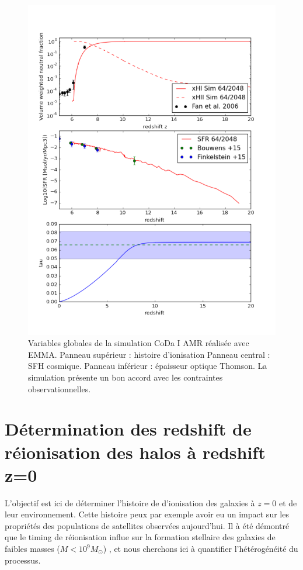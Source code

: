 \begin{figure}
        \includegraphics[width=.95\linewidth]{img/05/x_sfr_tau.pdf} 
        \caption[Contraintes CoDa I AMR]{ Variables globales de la simulation \ac{CoDa} I \ac{AMR} réalisée avec EMMA.
        Panneau supérieur : histoire d'ionisation
		Panneau central : SFH cosmique.
        Panneau inférieur : épaisseur optique Thomson.
        La simulation présente un bon accord avec les contraintes observationnelles.
		\label{fig:presCODAEMMA}}
\end{figure}


\section{Détermination des redshift de réionisation des halos à redshift z=0}

L'objectif est ici de déterminer l'histoire de d'ionisation des galaxies à $z=0$ et de leur environnement.
Cette histoire peux par exemple avoir eu un impact sur les propriétés des populations de satellites observées aujourd'hui.
Il à été démontré que le timing de réionisation influe sur la formation stellaire des galaxies de faibles masses ($M<10^9M_\odot$) \citep{ocvirk_reionization_2014}, et nous cherchons ici à quantifier l'hétérogénéité du processus.

